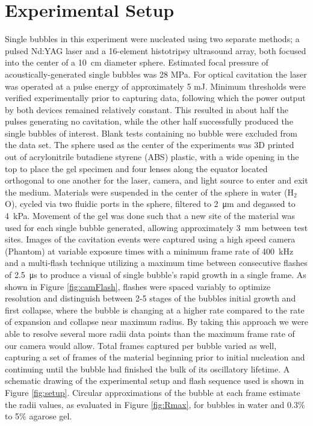 \documentclass[prl,aps,epsf,twocolumn,superscriptaddress]{revtex4-1}
\begin{document}
\section{Experimental Setup} %
Single bubbles in this experiment were nucleated using two separate methods; a pulsed Nd:YAG laser and a 16-element histotripsy ultrasound array, both focused into the center of a \SI{10}{\cm} diameter sphere. Estimated focal pressure of acoustically-generated single bubbles was 28 MPa. For optical cavitation the laser was operated at a pulse energy of approximately 5 mJ. Minimum thresholds were verified experimentally prior to capturing data, following which the power output by both devices remained relatively constant. This resulted in about half the pulses generating no cavitation, while the other half successfully produced the single bubbles of interest. Blank tests containing no bubble were excluded from the data set. The sphere used as the center of the experiments was 3D printed out of acrylonitrile butadiene styrene (ABS) plastic, with a wide opening in the top to place the gel specimen and four lenses along the equator located orthogonal to one another for the laser, camera, and light source to enter and exit the medium. Materials were suspended in the center of the sphere in water (H$_2$O), cycled via two fluidic ports in the sphere, filtered to \SI{2}{\um} and degassed to \SI{4}{\kPa}. Movement of the gel was done such that a new site of the material was used for each single bubble generated, allowing approximately \SI{3}{\mm} between test sites. Images of the cavitation events were captured using a high speed camera (Phantom) at variable exposure times with a minimum frame rate of \SI{400}{\kHz} and a multi-flash technique utilizing a maximum time between consecutive flashes of \SI{2.5}{\us} to produce a visual of single bubble's rapid growth in a single frame. As shown in Figure \ref{fig:camFlash}, flashes were spaced variably to optimize resolution and distinguish between 2-5 stages of the bubbles initial growth and first collapse, where the bubble is changing at a higher rate compared to the rate of expansion and collapse near maximum radius. By taking this approach we were able to resolve several more radii data points than the maximum frame rate of our camera would allow. Total frames captured per bubble varied as well, capturing a set of frames of the material beginning prior to initial nucleation and continuing until the bubble had finished the bulk of its oscillatory lifetime. A schematic drawing of the experimental setup and flash sequence used is shown in Figure \ref{fig:setup}. Circular approximations of the bubble at each frame estimate the radii values, as evaluated in Figure \ref{fig:Rmax}, for bubbles in water and 0.3\% to 5\% agarose gel. 
\end{document}
